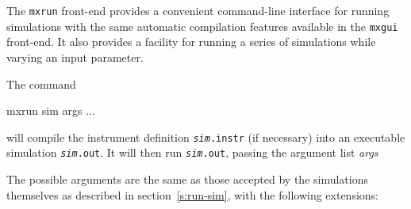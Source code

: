 The \verb+mxrun+ front-end provides a convenient
command-line interface for running simulations with the same automatic
compilation features available in the \verb+mxgui+ front-end. It also provides a
facility for running a series of simulations while varying an input parameter.

The command

\begin{bash}
mxrun sim args ...
\end{bash}

will compile the instrument definition \texttt{\textit{sim}.instr} (if
necessary) into an executable simulation \texttt{\textit{sim}.out}. It
will then run \texttt{\textit{sim}.out}, passing the argument list \textit{
  args}

The possible arguments are the same as those accepted by the simulations
themselves as described in section~\ref{s:run-sim}, with the following
extensions:
